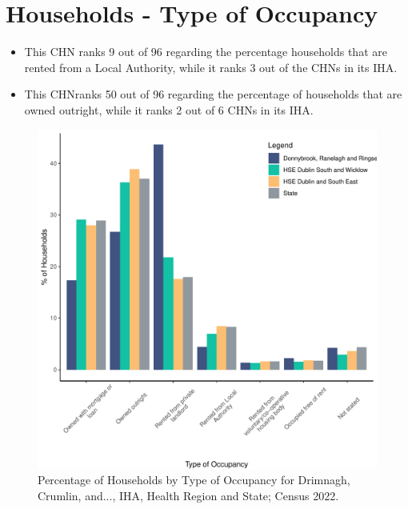 \documentclass{article}
\begin{document}
\section{Households - Type of Occupancy}\label{sect:Households}
\begin{itemize}
\item This CHN ranks  9 out of 96 regarding the percentage households that are rented from a Local Authority, while it ranks  3 out of the CHNs in its IHA. 
\item This CHNranks  50 out of 96 regarding the percentage of households that are owned outright, while it ranks   2 out of 6 CHNs in its IHA.
\end{itemize}
\begin{figure}[H]
	\centering
	\includegraphics[width = 140mm]{../figures/HouseholdsED.pdf}
	\caption{Percentage of Households by Type of Occupancy for Drimnagh, Crumlin, and..., IHA, Health Region and State; Census 2022.}
	\label{fig:vbnv}
	\end{figure}
\end{document}
